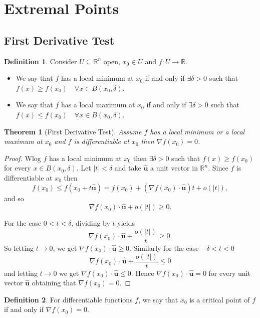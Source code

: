 \documentclass[11pt,openany]{book}
\theoremstyle{plain}
\newtheorem{theorem}{Theorem}[chapter]
\theoremstyle{definition}
\newtheorem{definition}{Definition}[chapter]
\theoremstyle{remark}
\newcommand{\R}{\mathbb{R}}
\begin{document}
\section{Extremal Points}
\subsection{First Derivative Test}
\begin{definition}
    Consider $U \subseteq \R^n$ open, $x_0 \in U$ and $f: U \to \R$.
\begin{itemize}
    
\item    We say that $f$ has a local minimum at $x_0$ if and only if $\exists \delta > 0$ such that $f(x) \ge f(x_0) \quad \forall x \in B(x_0,\delta)$. 
\item We say that $f$ has a local maximum at $x_0$ if and only if $\exists \delta > 0$ such that $f(x) \le f(x_0) \quad \forall x \in B(x_0,\delta)$.
\end{itemize}
\end{definition}
\begin{theorem}[First Derivative Test]
    Assume $f$ has a local minimum or a local maximum at $x_0$ and $f$ is differentiable at $x_0$ then $\nabla f(x_0) = 0$.
\end{theorem}

\begin{proof}
    Wlog $f$ has a local minimum at $x_0$ then $\exists \delta >0$ such that $f(x) \ge f(x_0)$ for every $x \in B(x_0, \delta)$. Let $|t| < \delta $ and take $\mathbf{\hat{u}}$ a unit vector in $\mathbb R^n$. Since $f$ is differentiable at $x_0$ then \[f(x_0)\leq f(x_0+t\mathbf{\hat{u}}) = f(x_0) + (\nabla f(x_0)\cdot \mathbf{\hat{u}})t + o(|t|),\] and so \[\nabla f(x_0) \cdot \mathbf{\hat{u}}+ o(|t|) \ge 0.\] 
    
    For the case $0<t<\delta$, dividing by $t$ yields\[\nabla f(x_0) \cdot \mathbf{\hat{u}}+ \frac{o(|t|)}{t} \ge 0.\] So letting $t \to 0$, we get $\nabla f(x_0) \cdot \mathbf{\hat{u}} \ge 0$. Similarly for the case $-\delta<t < 0$ \[\nabla f(x_0) \cdot \mathbf{\hat{u}}+ \frac{o(|t|)}{t} \le 0\] and letting $t \to 0$ we get $\nabla f(x_0) \cdot \mathbf{\hat{u}} \le 0$. Hence $\nabla f(x_0) \cdot \mathbf{\hat{u}} = 0$ for every unit vector $\mathbf{\hat{u}}$ obtaining that $\nabla f(x_0) = 0$.
\end{proof}

\begin{definition}
    For differentiable functions $f$, we say that $x_0$ is a critical point of $f$ if and only if $\nabla f(x_0)=0.$
\end{definition}
\end{document}
